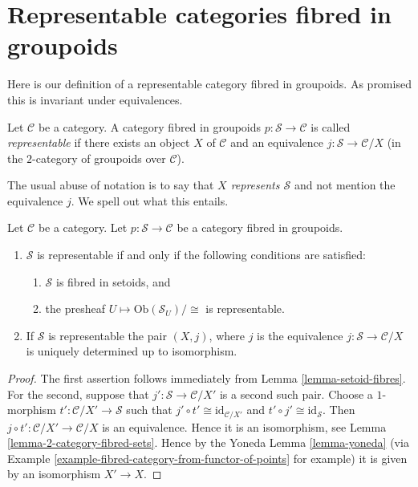 \section{Representable categories fibred in groupoids}
\label{section-representable-fibred-groupoids}

\noindent
Here is our definition of a representable category fibred in groupoids.
As promised this is invariant under equivalences.

\begin{definition}
\label{definition-representable-fibred-category}
Let $\mathcal{C}$ be a category.
A category fibred in groupoids $p : \mathcal{S} \to \mathcal{C}$ is
called {\it representable} if there exists an object
$X$ of $\mathcal{C}$ and an equivalence $j : \mathcal{S} \to \mathcal{C}/X$
(in the $2$-category of groupoids over $\mathcal{C}$).
\end{definition}

\noindent
The usual abuse of notation is to say that {\it $X$ represents $\mathcal{S}$}
and not mention the equivalence $j$. We spell out what this entails.

\begin{lemma}
\label{lemma-characterize-representable-fibred-category}
Let $\mathcal{C}$ be a category.
Let $p : \mathcal{S} \to \mathcal{C}$ be a category fibred in groupoids.
\begin{enumerate}
\item $\mathcal{S}$ is representable if and only if
the following conditions are satisfied:
\begin{enumerate}
\item $\mathcal{S}$ is fibred in setoids, and
\item the presheaf $U \mapsto \text{Ob}(\mathcal{S}_U)/\cong$ is
representable.
\end{enumerate}
\item If $\mathcal{S}$ is representable the pair $(X, j)$, where $j$ is the
equivalence $j : \mathcal{S} \to \mathcal{C}/X$ is uniquely determined
up to isomorphism.
\end{enumerate}
\end{lemma}

\begin{proof}
The first assertion follows immediately from
Lemma \ref{lemma-setoid-fibres}.
For the second, suppose that $j' : \mathcal{S} \to \mathcal{C}/X'$ is
a second such pair. Choose a $1$-morphism
$t' : \mathcal{C}/X' \to \mathcal{S}$ such that
$j' \circ t' \cong \text{id}_{\mathcal{C}/X'}$ and
$t' \circ j' \cong \text{id}_{\mathcal{S}}$. Then
$j \circ t' : \mathcal{C}/X' \to \mathcal{C}/X$ is an equivalence.
Hence it is an isomorphism, see Lemma \ref{lemma-2-category-fibred-sets}.
Hence by the Yoneda Lemma \ref{lemma-yoneda} (via
Example \ref{example-fibred-category-from-functor-of-points} for example)
it is given by an isomorphism $X' \to X$.
\end{proof}

